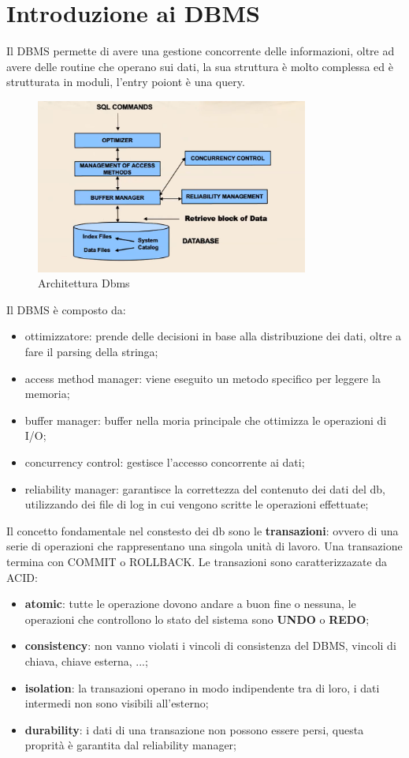 \documentclass[12pt]{article}
\begin{document}
\section{Introduzione ai DBMS}
Il DBMS permette di avere una gestione concorrente delle informazioni, oltre ad avere delle routine che operano sui dati, la sua struttura \`e molto complessa ed \`e strutturata in moduli, l'entry poiont \`e una query.
\begin{figure}[H]
    \centering
    \includegraphics[width=0.8\textwidth]{architettura-dbms.png}
    \caption{Architettura Dbms}
    \label{fig:architettura-dbms}
\end{figure}
Il DBMS \`e composto da:
\begin{itemize}
    \item ottimizzatore: prende delle decisioni in base alla distribuzione dei dati, oltre a fare il parsing della stringa;
    \item access method manager: viene eseguito un metodo specifico per leggere la memoria;
    \item buffer manager: buffer nella moria principale che ottimizza le operazioni di I/O;
    \item concurrency control: gestisce l'accesso concorrente ai dati;
    \item reliability manager: garantisce la correttezza del contenuto dei dati del db, utilizzando dei file di log in cui vengono scritte le operazioni effettuate;
\end{itemize}

Il concetto fondamentale nel constesto dei db sono le \textbf{transazioni}: ovvero di una serie di operazioni che rappresentano una singola unit\`a  di lavoro. Una transazione termina con COMMIT o ROLLBACK. Le transazioni sono caratterizzazate da ACID:
\begin{itemize}
    \item \textbf{atomic}: tutte le operazione dovono andare a buon fine o nessuna, le operazioni che controllono lo stato del sistema sono \textbf{UNDO} o \textbf{REDO};
    \item \textbf{consistency}: non vanno violati i vincoli di consistenza del DBMS, vincoli di chiava, chiave esterna, ...;
    \item \textbf{isolation}: la transazioni operano in modo indipendente tra di loro, i dati intermedi non sono visibili all'esterno;
    \item \textbf{durability}: i dati di una transazione non possono essere persi, questa proprit\`a \`e garantita dal reliability manager;
\end{itemize}
\end{document}
